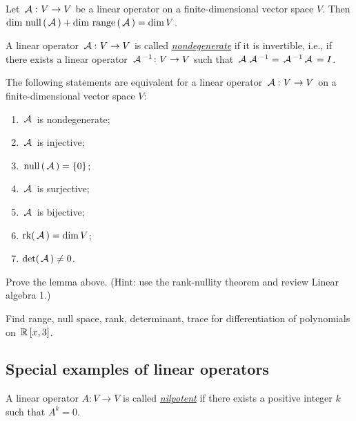 \begin{theorem}
Let $\,\mathcal{A}\,\colon V \to V$ be a linear operator on a finite-dimensional vector space $V$. Then
    $\dim \,\mathrm{null}\,(\,\mathcal{A}\,) + \dim \,\mathrm{range}\,(\,\mathcal{A}\,) = \dim V$.
\end{theorem}

\begin{definition}
A linear operator $\,\mathcal{A}\,\colon V \to V$ is called \underline{\it nondegenerate} if it is invertible, i.e., if there exists a linear operator $\,\mathcal{A}\,^{-1}\colon V \to V$ such that $\,\mathcal{A}\, \,\mathcal{A}\,^{-1}= \,\mathcal{A}\,^{-1} \,\mathcal{A}\, = I$.
\end{definition}

\begin{lemma}
   The following statements are equivalent for a linear operator $\,\mathcal{A}\,\colon V \to V$ on a finite-dimensional vector space $V$:
    \begin{enumerate}[(1)]
        \item $\,\mathcal{A}\,$ is nondegenerate;
        \item $\,\mathcal{A}\,$ is injective;
        \item $\,\mathrm{null}\,(\,\mathcal{A}\,) = \{0\}$;
        \item $\,\mathcal{A}\,$ is surjective;
        \item $\,\mathcal{A}\,$ is bijective;
        \item $\operatorname{rk}(\,\mathcal{A}\,) = \dim V$;
        \item $\det(\,\mathcal{A}\,) \neq 0$.
    \end{enumerate}
\end{lemma}

\begin{exercise}
Prove the lemma above. (Hint: use the rank-nullity theorem and review Linear algebra 1.)
\end{exercise}

\begin{exercise}
Find range, null space, rank, determinant, trace for differentiation of polynomials on $\,\mathbb{R}\,[x, 3]$.
\end{exercise}

\subsection{Special examples of linear operators}

\begin{definition}
A linear operator $A\colon V \to V$ is called \underline{\it nilpotent} if there exists a positive integer $k$ such that $A^k = 0$.
\end{definition}

